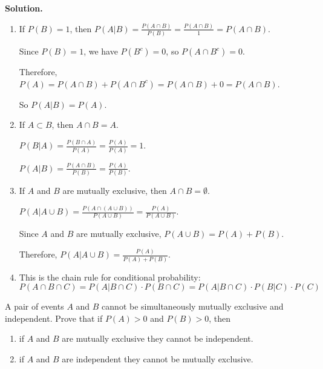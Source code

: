 \noindent\textbf{Solution.}
\begin{enumerate}[label=(\alph*)]
    \item If $P(B) = 1$, then $P(A|B) = \frac{P(A \cap B)}{P(B)} = \frac{P(A \cap B)}{1} = P(A \cap B)$.
    
    Since $P(B) = 1$, we have $P(B^c) = 0$, so $P(A \cap B^c) = 0$.
    
    Therefore, $P(A) = P(A \cap B) + P(A \cap B^c) = P(A \cap B) + 0 = P(A \cap B)$.
    
    So $P(A|B) = P(A)$.
    
    \item If $A \subset B$, then $A \cap B = A$.
    
    $P(B|A) = \frac{P(B \cap A)}{P(A)} = \frac{P(A)}{P(A)} = 1$.
    
    $P(A|B) = \frac{P(A \cap B)}{P(B)} = \frac{P(A)}{P(B)}$.
    
    \item If $A$ and $B$ are mutually exclusive, then $A \cap B = \emptyset$.
    
    $P(A|A \cup B) = \frac{P(A \cap (A \cup B))}{P(A \cup B)} = \frac{P(A)}{P(A \cup B)}$.
    
    Since $A$ and $B$ are mutually exclusive, $P(A \cup B) = P(A) + P(B)$.
    
    Therefore, $P(A|A \cup B) = \frac{P(A)}{P(A) + P(B)}$.
    
    \item This is the chain rule for conditional probability:
    \[ P(A \cap B \cap C) = P(A|B \cap C) \cdot P(B \cap C) = P(A|B \cap C) \cdot P(B|C) \cdot P(C) \]
\end{enumerate}


\begin{problembox}
A pair of events $A$ and $B$ cannot be simultaneously mutually exclusive and independent. Prove that if $P(A)>0$ and $P(B)>0$, then
\begin{enumerate}[label=(\alph*)]
    \item if $A$ and $B$ are mutually exclusive they cannot be independent.
    \item if $A$ and $B$ are independent they cannot be mutually exclusive.
\end{enumerate}
\end{problembox}

